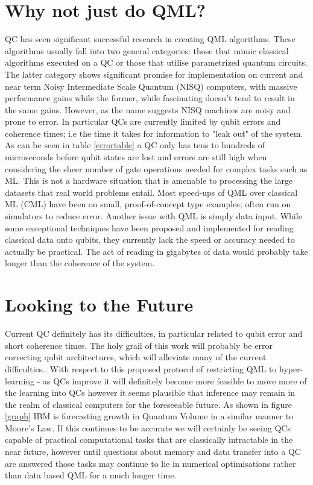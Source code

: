 \documentclass[a0,portrait]{a0poster}
\begin{document}
\begin{multicols}{2}
\section*{Why not just do QML?}
  QC has seen significant successful research in creating QML algorithms. These algorithms usually fall into two general categories: those that mimic classical algorithms executed on a QC or those that utilise parametrized quantum circuits\cite{prezsalinas2019data}. The latter category shows significant promise for implementation on current and near term Noisy Intermediate Scale Quantum (NISQ) computers\cite{national2019quantum}, with massive performance gains while the former, while fascinating doesn't tend to result in the same gains.  However, as the name suggests NISQ machines are noisy and prone to error. In particular QCs are currently limited by qubit errors and coherence times; i.e the time it takes for information to "leak out" of the system\cite{IBM_2019}. As can be seen in table \ref{errortable} a QC only has tens to hundreds of microseconds before qubit states are lost and errors are still high when considering the sheer number of gate operations needed for complex tasks such as ML. This is not a hardware situation that is amenable to processing the large datasets that real world problems entail. Most speed-ups of QML over classical ML (CML) have been on small, proof-of-concept type examples; often run on simulators to reduce error. Another issue with QML is simply data input. While some exceptional techniques have been proposed and implemented for reading classical data onto qubits, they currently lack the speed or accuracy needed to actually be practical\cite{prezsalinas2019data}. The act of reading in gigabytes of data would probably take longer than the coherence of the system. 

\section*{Looking to the Future}
Current QC definitely has its difficulties, in particular related to qubit error and short coherence times. The holy grail of this work will probably be error correcting qubit architectures, which will alleviate many of the current difficulties\cite{national2019quantum}.. With respect to this proposed protocol of restricting QML to hyper-learning - as QCs improve it will definitely become more feasible to move more of the learning into QCs however it seems plausible that inference may remain in the realm of classical computers for the foreseeable future. As shown in figure \ref{graph} IBM is forecasting growth in Quantum Volume in a similar manner to Moore's Law. If this continues to be accurate we will certainly be seeing QCs capable of practical computational tasks that are classically intractable in the near future, however until questions about memory and data transfer into a QC are answered those tasks may continue to lie in numerical optimisations rather than data based QML for a much longer time\cite{national2019quantum}.


\end{multicols}
\end{document}
